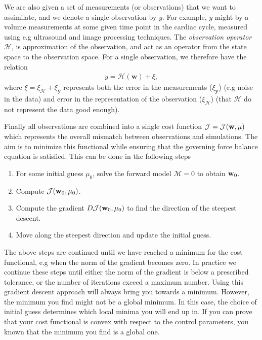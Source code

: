 We are also given a set of measurements (or observations) that we want
to assimilate, and we denote a single observation by $y$.
For example, $y$ might by a volume measurements at some given time
point in the cardiac cycle, measured using e.g ultrasound and image
processing techniques. The \emph{observation operator} $\mathcal{H}$,
is approximation of the observation, and act as an operator from the
state space to the observation space. For a single observation, we
therefore have the relation
\begin{align}
  y = \mathcal{H}(\mathbf{w}) + \xi, 
\end{align}
where $\xi = \xi_{\mathbf{\mathcal{H}}} + \xi_{\mathbf{y}}$ represents
both the error in the measurements ($\xi_{\mathbf{y}}$) (e.g
noise in the data) and error in the representation of the observation
($\xi_{\mathbf{\mathcal{H}}}$) (that $\mathcal{H}$ do not represent
the data good enough).

Finally all observations are combined into a single cost function
$\mathcal{J} = \mathcal{J}(\mathbf{w}, \mu)$ which represents the overall mismatch between
observations and simulations. The aim is to minimize this functional
while ensuring that the governing force balance equation is
satisfied. This can be done in the following steps

\begin{enumerate}
  \item For some initial guess $\mu_0$, solve the forward model
    $\mathcal{M} = 0$ to obtain $\mathbf{w}_0$.
  \item Compute $\mathcal{J}(\mathbf{w}_0, \mu_0)$.
  \item Compute the gradient $D \mathcal{J}(\mathbf{w}_0, \mu_0)$ to find
    the direction of the steepest descent.
  \item Move along the steepest direction and update the initial
    guess.
\end{enumerate}
The above steps are continued until we have reached a minimum for the
cost functional, e.g when the norm of the gradient becomes zero. In
practice we continue these steps until either the norm of the
gradient is below a prescribed tolerance, or the number of iterations
exceed a maximum number. Using this gradient descent approach will
always bring you towards a minimum. However, the minimum you find
might not be a global minimum. In this case, the choice of initial
guess determines which local minima you will end up in. If you can
prove that your cost functional is convex with respect to the control
parameters, you known that the minimum you find is a global
one.

